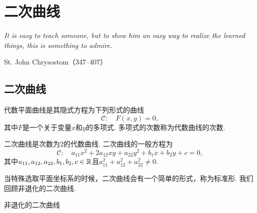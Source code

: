 \chapter{二次曲线}
\begin{proverb}
  { \itshape
   It is easy to teach someone, but to show him
   an easy way to realize the learned things, this
   is something to admire.
  }

\hfill St. John Chrysostom（347--407）
\end{proverb}

\section{二次曲线}
\begin{definition}
  代数平面曲线是其隐式方程为下列形式的曲线
  \[
    \mathscr C:\quad F(x,y) = 0,
  \]
  其中$F$是一个关于变量$x$和$y$的多项式. 多项式的次数称为代数曲线的次数.
\end{definition}

\begin{definition}
  二次曲线是次数为2的代数曲线. 二次曲线的一般方程为
  \[
    \mathscr C:\quad a_{11}x^2 + 2a_{12}xy + a_{22}y^2 + b_1x + b_2y + c = 0,
  \]
  其中$a_{11},a_{12},a_{22},b_1,b_2,c\in\mathbb R$且$a_{11}^2+a_{12}^2
  +a_{22}^2\ne0$.
\end{definition}

当特殊选取平面坐标系的时候，二次曲线会有一个简单的形式，称为标准形. 我们回顾非退化的二次曲线.

{\noindent \kaishu 非退化的二次曲线}

